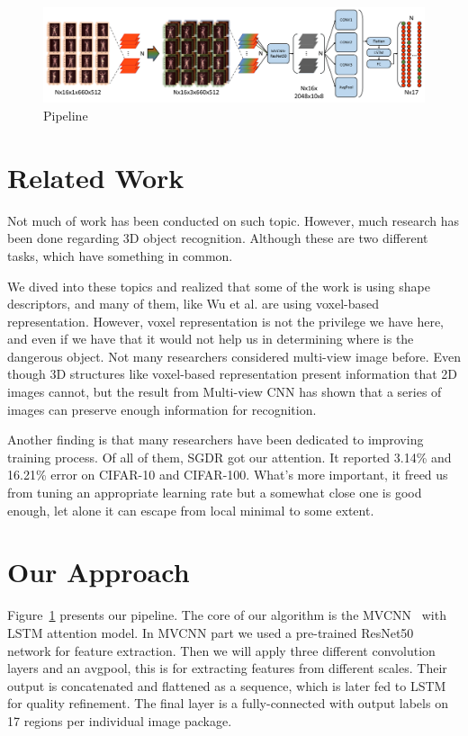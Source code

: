 \documentclass[conference,compsoc]{IEEEtran}
\begin{document}
\begin{figure}[!t]
\includegraphics[width=\textwidth]{../Pic/Network.pdf}
\caption{Pipeline}
\label{network}
\end{figure}

\section{Related Work}
Not much of work has been conducted on such topic. However, much research has been done regarding 3D object recognition. Although these are two different tasks, which have something in common.

We dived into these topics and realized that some of the work is using shape descriptors, and many of them, like Wu et al. \cite{wu20153d} are using voxel-based representation. However, voxel representation is not the privilege we have here, and even if we have that it would not help us in determining where is the dangerous object.
Not many researchers considered multi-view image before. Even though 3D structures like voxel-based representation present information that 2D images cannot, but the result from Multi-view CNN\cite{su15mvcnn}\cite{qi2016volumetric} has shown that a series of images can preserve enough information for recognition.

Another finding is that many researchers have been dedicated to improving training process. Of all of them, SGDR got our attention. It reported 3.14\% and 16.21\% error on CIFAR-10 and CIFAR-100. What's more important, it freed us from tuning an appropriate learning rate but a somewhat close one is good enough, let alone it can escape from local minimal to some extent.


\section{Our Approach}
Figure~\ref{network} presents our pipeline. The core of our algorithm is the MVCNN~\cite{su15mvcnn} with LSTM attention model. In MVCNN part we used a pre-trained ResNet50\cite{he2016deep} network for feature extraction. Then we will apply three different convolution layers and an avgpool, this is for extracting features from different scales. Their output is concatenated and flattened as a sequence, which is later fed to LSTM for quality refinement. The final layer is a fully-connected with output labels on 17 regions per individual image package.
\end{document}
